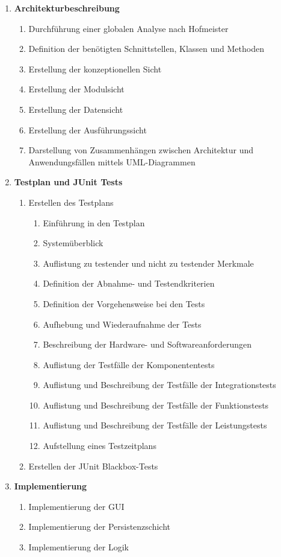 \documentclass[fontsize=12pt,paper=a4,twoside]{scrartcl}
\begin{document}
\begin{enumerate}
\item \textbf{Architekturbeschreibung}
	\begin{enumerate}[label={(\arabic*)}]
	\item Durchführung einer globalen Analyse nach Hofmeister
	\item Definition der benötigten Schnittstellen, Klassen und Methoden
	\item Erstellung der konzeptionellen Sicht
	\item Erstellung der Modulsicht
	\item Erstellung der Datensicht
	\item Erstellung der Ausführungssicht
	\item Darstellung von Zusammenhängen zwischen Architektur und Anwendungsfällen mittels UML-Diagrammen
	\end{enumerate}
\item \textbf{Testplan und JUnit Tests}
		\begin{enumerate}[label={(\arabic*)}]
		\item Erstellen des Testplans
			\begin{enumerate}[label={(\arabic*)}]
			\item Einführung in den Testplan
			\item Systemüberblick
			\item Auflistung zu testender und nicht zu testender Merkmale
			\item Definition der Abnahme- und Testendkriterien
			\item Definition der Vorgehensweise bei den Tests
			\item Aufhebung und Wiederaufnahme der Tests
			\item Beschreibung der Hardware- und Softwareanforderungen
			\item Auflistung der Testfälle der Komponententests
			\item Auflistung und Beschreibung der Testfälle der Integrationstests
			\item Auflistung und Beschreibung der Testfälle der Funktionstests
			\item Auflistung und Beschreibung der Testfälle der Leistungstests
			\item Aufstellung eines Testzeitplans
			\end{enumerate}
		\item Erstellen der JUnit Blackbox-Tests
		\end{enumerate}
\item \textbf{Implementierung}
		\begin{enumerate}[label={(\arabic*)}]
		\item Implementierung der GUI
		\item Implementierung der Persistenzschicht
		\item Implementierung der Logik
		\end{enumerate}	
\end{enumerate}
\end{document}
